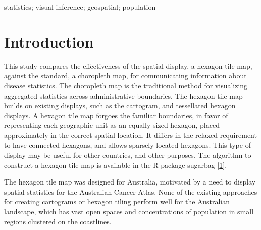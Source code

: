 \documentclass[conference,final,]{IEEEtran}
\begin{document}
\begin{IEEEkeywords}
statistics; visual inference; geospatial; population
\end{IEEEkeywords}




\maketitle


%
\IEEEpeerreviewmaketitle


\hypertarget{introduction}{%
\section{Introduction}\label{introduction}}

This study compares the effectiveness of the spatial display, a hexagon tile map, against the standard, a choropleth map, for communicating information about disease statistics. The choropleth map is the traditional method for visualizing aggregated statistics across administrative boundaries. The hexagon tile map builds on existing displays, such as the cartogram, and tessellated hexagon displays. A hexagon tile map forgoes the familiar boundaries, in favor of representing each geographic unit as an equally sized hexagon, placed approximately in the correct spatial location. It differs in the relaxed requirement to have connected hexagons, and allows sparsely located hexagons. This type of display may be useful for other countries, and other purposes. The algorithm to construct a hexagon tile map is available in the R package sugarbag {[}\protect\hyperlink{ref-sugarbag}{1}{]}.

The hexagon tile map was designed for Australia, motivated by a need to display spatial statistics for the Australian Cancer Atlas. None of the existing approaches for creating cartograms or hexagon tiling perform well for the Australian landscape, which has vast open spaces and concentrations of population in small regions clustered on the coastlines.
\end{document}

